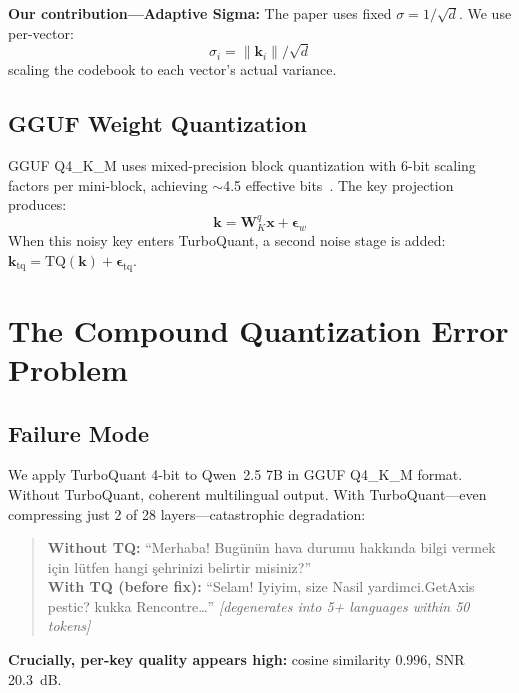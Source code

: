 \documentclass[11pt]{article}
\begin{document}
\textbf{Our contribution---Adaptive Sigma:} The paper uses fixed $\sigma = 1/\sqrt{d}$. We use per-vector:
\begin{equation}
    \sigma_i = \|\mathbf{k}_i\| / \sqrt{d}
\end{equation}
scaling the codebook to each vector's actual variance.

\subsection{GGUF Weight Quantization}

GGUF Q4\_K\_M uses mixed-precision block quantization with 6-bit scaling factors per mini-block, achieving $\sim$4.5 effective bits~\citep{gguf}. The key projection produces:
\begin{equation}
    \mathbf{k} = \mathbf{W}_{K}^{q} \mathbf{x} + \boldsymbol{\epsilon}_w
\end{equation}
When this noisy key enters TurboQuant, a second noise stage is added: $\mathbf{k}_{\text{tq}} = \text{TQ}(\mathbf{k}) + \boldsymbol{\epsilon}_{\text{tq}}$.

\section{The Compound Quantization Error Problem}
\label{sec:compound}

\subsection{Failure Mode}

We apply TurboQuant 4-bit to Qwen~2.5 7B in GGUF Q4\_K\_M format. Without TurboQuant, coherent multilingual output. With TurboQuant---even compressing just 2 of 28 layers---catastrophic degradation:

\begin{quote}
\small
\textbf{Without TQ:} ``Merhaba! Bug\"un\"un hava durumu hakk{\i}nda bilgi vermek i\c{c}in l\"utfen hangi \c{s}ehrinizi belirtir misiniz?'' \\[0.5em]
\textbf{With TQ (before fix):} ``Selam! Iyiyim, size Nasil yardimci.GetAxis pestic? kukka Rencontre\ldots'' \emph{[degenerates into 5+ languages within 50 tokens]}
\end{quote}

\textbf{Crucially, per-key quality appears high:} cosine similarity 0.996, SNR 20.3~dB.
\end{document}
